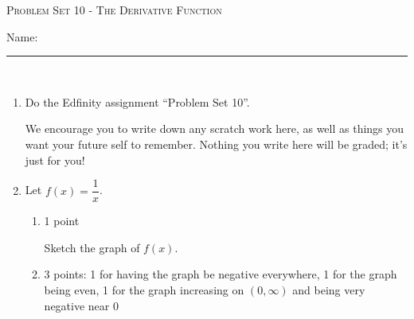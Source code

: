 \documentclass{article}
\newcommand{\doedfinity}[2][\newpage]{
  \begin{problem}[#1]
    Do the Edfinity assignment ``Problem Set #2''.

    We encourage you to write down any scratch work here, as well as
    things you want your future self to remember. Nothing you write
    here will be graded; it's just for you!
  \end{problem}
}
\begin{document}
\begin{center}
  \large\textsc{Problem Set 10 - The Derivative Function}\\\vspace{.5in}
  \begin{problemonly}
   \large Name: \rule{5cm}{0.15mm}\\
   \end{problemonly}
\end{center}

\begin{enumerate}
\item  {}

  \doedfinity{10}

\item  

  Let $f(x)=\dfrac{1}{x}$.
  \begin{enumerate}

  \item \label{derivative-of-1/x-graph-1/x}

    \begin{grading}
      1 point
    \end{grading}

    \begin{problem}[\vfill]
      Sketch the graph of $f(x)$. 
    \end{problem}

    \begin{solution}       
      \begin{center}
      \end{center}
    \end{solution}

  \item \label{derivative-of-1/x-graph}

    \begin{grading}
      3 points: 1 for having the graph be negative everywhere, 1 for the graph being even, 1 for the graph increasing on $(0, \infty)$ and being very negative near 0
    \end{grading} 


\end{enumerate}
\end{enumerate}
\end{document}
